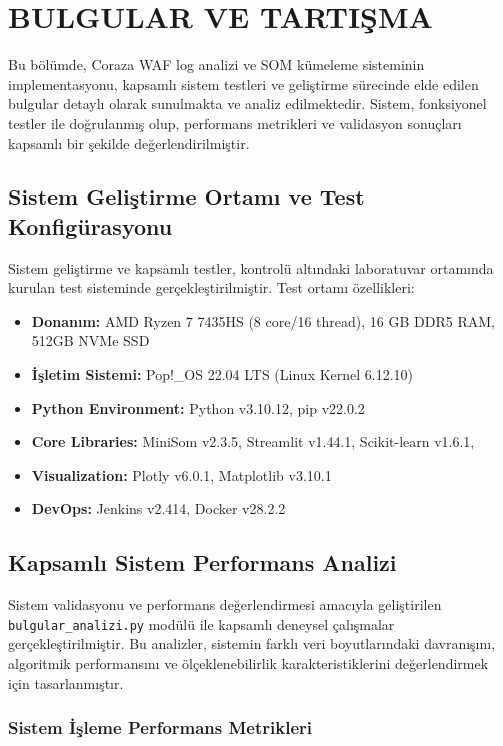 \section{BULGULAR VE TARTIŞMA}

Bu bölümde, Coraza WAF log analizi ve SOM kümeleme sisteminin implementasyonu, kapsamlı sistem testleri ve geliştirme sürecinde elde edilen bulgular detaylı olarak sunulmakta ve analiz edilmektedir. Sistem, fonksiyonel testler ile doğrulanmış olup, performans metrikleri ve validasyon sonuçları kapsamlı bir şekilde değerlendirilmiştir.

\subsection{Sistem Geliştirme Ortamı ve Test Konfigürasyonu}

Sistem geliştirme ve kapsamlı testler, kontrolü altındaki laboratuvar ortamında kurulan test sisteminde gerçekleştirilmiştir. Test ortamı özellikleri:

\begin{itemize}
    \item \textbf{Donanım:} AMD Ryzen 7 7435HS (8 core/16 thread), 16 GB DDR5 RAM, 512GB NVMe SSD
    \item \textbf{İşletim Sistemi:} Pop!\_OS 22.04 LTS (Linux Kernel 6.12.10)
    \item \textbf{Python Environment:} Python v3.10.12, pip v22.0.2
    \item \textbf{Core Libraries:} MiniSom v2.3.5, Streamlit v1.44.1, Scikit-learn v1.6.1, 
    \item \textbf{Visualization:} Plotly v6.0.1, Matplotlib v3.10.1
    \item \textbf{DevOps:} Jenkins v2.414, Docker v28.2.2
\end{itemize}

\subsection{Kapsamlı Sistem Performans Analizi}

Sistem validasyonu ve performans değerlendirmesi amacıyla geliştirilen \texttt{bulgular\_analizi.py} modülü ile kapsamlı deneysel çalışmalar gerçekleştirilmiştir. Bu analizler, sistemin farklı veri boyutlarındaki davranışını, algoritmik performansını ve ölçeklenebilirlik karakteristiklerini değerlendirmek için tasarlanmıştır.

\subsubsection{Sistem İşleme Performans Metrikleri}

